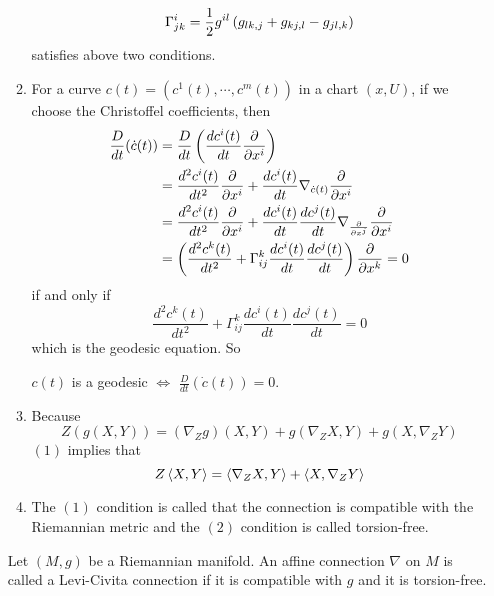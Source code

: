 \begin{enumerate}[label=\arabic{*}.]
\begin{rmk}
\begin{enumerate}[label=(\roman{*})]
			\begin{equation*}
				\Gamma^i_{jk} = \frac{1}{2}g^{il}\left(g_{lk,j}+g_{kj,l}-g_{jl,k}\right)
			\end{equation*}
			satisfies above two conditions. 
			\item For a curve $c(t) = (c^1(t),\cdots,c^m(t))$ in a chart $(x,U)$, if we choose the Christoffel coefficients, then
			\begin{equation*}
				\begin{aligned}
					\frac{D}{dt}(\dot{c}(t)) &= \frac{D}{dt}\left(\frac{dc^i(t)}{dt}\frac{\partial}{\partial x^i}\right) \\
					&= \frac{d^2c^i(t)}{dt^2}\frac{\partial}{\partial x^i} + \frac{dc^i(t)}{dt}\nabla_{\dot{c}(t)}\frac{\partial}{\partial x^i}\\
					&= \frac{d^2c^i(t)}{dt^2}\frac{\partial}{\partial x^i} + \frac{dc^i(t)}{dt}\frac{dc^j(t)}{dt}\nabla_{\frac{\partial}{\partial x^j}}\frac{\partial}{\partial x^i}\\
					&= \left(\frac{d^2c^k(t)}{dt^2}+\Gamma_{ij}^k\frac{dc^i(t)}{dt}\frac{dc^j(t)}{dt}\right)\frac{\partial}{\partial x^k} =0
				\end{aligned}
			\end{equation*}
			if and only if
			\begin{equation*}
				\frac{d^2c^k(t)}{dt^2}+\Gamma_{ij}^k\frac{dc^i(t)}{dt}\frac{dc^j(t)}{dt} = 0
			\end{equation*}
			which is the geodesic equation. So
			\begin{center}
				$c(t)$ is a geodesic $\Leftrightarrow$ $\frac{D}{dt}(\dot{c}(t)) = 0$.
			\end{center}
			\item Because
			\begin{equation*}
				Z(g(X,Y)) = (\nabla_Zg)(X,Y) + g(\nabla_ZX,Y) + g(X,\nabla_Z Y)
			\end{equation*}
			$(1)$ implies that
			\begin{equation*}
				Z\left\langle X,Y \right\rangle = \left\langle \nabla_ZX,Y \right\rangle+\left\langle X,\nabla_Z Y \right\rangle
			\end{equation*}
			\item The $(1)$ condition is called that the connection is compatible with the Riemannian metric and the $(2)$ condition is called torsion-free.
		\end{enumerate}
	\end{rmk}

	\begin{defn}
		Let $(M,g)$ be a Riemannian manifold. An affine connection $\nabla$ on $M$ is called a Levi-Civita connection if it is compatible with $g$ and it is torsion-free.
	\end{defn}


\end{enumerate}
